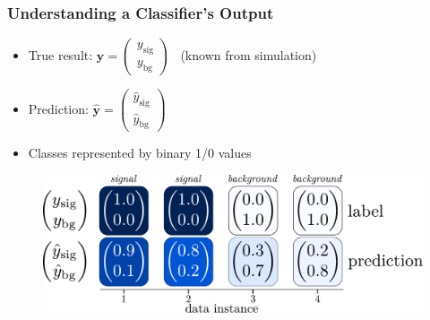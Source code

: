 \documentclass[14pt, t]{beamer}
\renewcommand{\vec}[1]{\bm{#1}}
\newcommand{\y}{\vec{y}}
\begin{document}
\begin{frame}
    \frametitle{Understanding a Classifier's Output}
    \begin{itemize}
    
        \item True result:
        $ \vec{y} = 
        \begin{pmatrix}
            y_{\text{sig}}\\[-0.5mm]
            y_{\text{bg}}
        \end{pmatrix} $ \ {\small (known from simulation)}

        \item Prediction: \hspace{-1.0mm}
        $ \hat{\y} = 
        \begin{pmatrix}
            \hat{y}_{\text{sig}}\\[-0.5mm]
            \hat{y}_{\text{bg}}
        \end{pmatrix} $

        \item Classes represented by binary 1/0 values
        
    \end{itemize}
    
    \begin{figure}[htb!]
        \centering
        \includegraphics[width=\linewidth]{vector/binary-output.pdf}
    \end{figure}
    
\end{frame}

\end{document}
